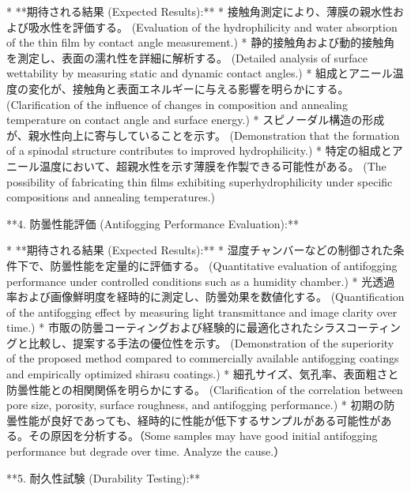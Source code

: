 \documentclass{article}
\begin{document}
*   **期待される結果 (Expected Results):**
    *   接触角測定により、薄膜の親水性および吸水性を評価する。 (Evaluation of the hydrophilicity and water absorption of the thin film by contact angle measurement.)
    *   静的接触角および動的接触角を測定し、表面の濡れ性を詳細に解析する。 (Detailed analysis of surface wettability by measuring static and dynamic contact angles.)
    *   組成とアニール温度の変化が、接触角と表面エネルギーに与える影響を明らかにする。 (Clarification of the influence of changes in composition and annealing temperature on contact angle and surface energy.)
    *   スピノーダル構造の形成が、親水性向上に寄与していることを示す。 (Demonstration that the formation of a spinodal structure contributes to improved hydrophilicity.)
    *   特定の組成とアニール温度において、超親水性を示す薄膜を作製できる可能性がある。 (The possibility of fabricating thin films exhibiting superhydrophilicity under specific compositions and annealing temperatures.)

**4. 防曇性能評価 (Antifogging Performance Evaluation):**

*   **期待される結果 (Expected Results):**
    *   湿度チャンバーなどの制御された条件下で、防曇性能を定量的に評価する。 (Quantitative evaluation of antifogging performance under controlled conditions such as a humidity chamber.)
    *   光透過率および画像鮮明度を経時的に測定し、防曇効果を数値化する。 (Quantification of the antifogging effect by measuring light transmittance and image clarity over time.)
    *   市販の防曇コーティングおよび経験的に最適化されたシラスコーティングと比較し、提案する手法の優位性を示す。 (Demonstration of the superiority of the proposed method compared to commercially available antifogging coatings and empirically optimized shirasu coatings.)
    *   細孔サイズ、気孔率、表面粗さと防曇性能との相関関係を明らかにする。 (Clarification of the correlation between pore size, porosity, surface roughness, and antifogging performance.)
    *   初期の防曇性能が良好であっても、経時的に性能が低下するサンプルがある可能性がある。その原因を分析する。（Some samples may have good initial antifogging performance but degrade over time. Analyze the cause.）

**5. 耐久性試験 (Durability Testing):**
\end{document}
